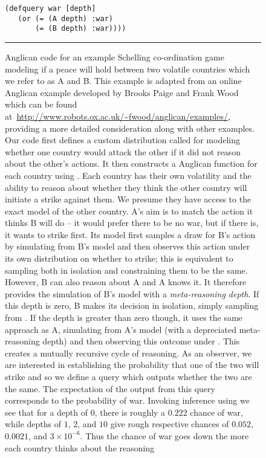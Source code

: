 \begin{figure}[p]
\begin{lstlisting}[basicstyle=\ttfamily\footnotesize,multicols=2,frame=none]
 (defquery war [depth]
   (or (= (A depth) :war)
       (= (B depth) :war))))
\end{lstlisting}	
\vspace{-20pt}		
\rule{\linewidth}{0.4pt}
		\caption{Anglican code for an example Schelling co-ordination game~\citep{schelling1980strategy,stuhlmuller2014reasoning}
		modeling if a peace will hold between two volatile countries which we refer to as A and B.
		This example is adapted from an online Anglican example developed by Brooks Paige and Frank Wood
		which can be found at~\url{http://www.robots.ox.ac.uk/~fwood/anglican/examples/}, providing a more
		detailed consideration along with other examples.
		Our code first defines a custom distribution called  for modeling whether one country would
		attack the other if it did not reason about the other's actions.  
It then constructs a Anglican function for each country using .  
Each country has their own volatility and the ability to reason about whether they think the other country will
initiate a strike against them. We presume they have access to the exact model of the other country.  A's aim is to match
the action it thinks B will do -- it would prefer there to be no war, but if there is, it wants to strike
first.  Its model first samples a draw for B's action by simulating from B's model and then observes this action
under its own distribution on whether to strike; this is equivalent to sampling both in isolation and constraining
them to be the same.  However, B can also reason about A and
A knows it.  It therefore provides the simulation of B's model with a \emph{meta-reasoning depth}.  If this depth
is zero, B makes its decision in isolation, simply sampling from .  If the depth is greater 
than zero though, it uses the same approach as A, simulating from A's model (with a depreciated meta-reasoning 
depth) and then observing this 
outcome under .  This creates a mutually recursive cycle of reasoning.  As an observer, we are
interested in establishing the probability that one of the two will strike
and so we define a query which outputs whether the two are the same.
The expectation of the output from this query corresponds to the probability of war.
Invoking inference using  we see that for a depth of $0$, there
is roughly a $0.222$ chance of war, while depths of $1$, $2$, and $10$ give rough respective chances of $0.052$, $0.0021$,
and $3\times10^{-6}$.  Thus the chance of war goes down the more each country thinks about the reasoning
}
\end{figure}
